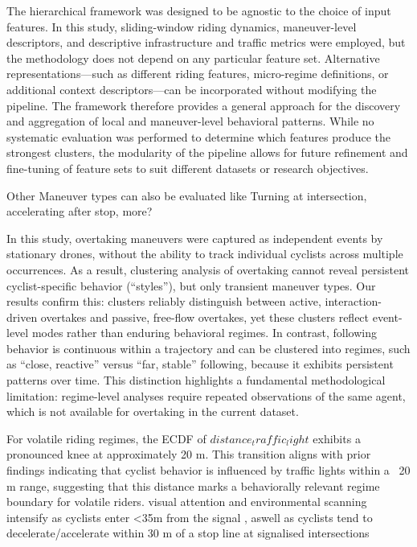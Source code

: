 The hierarchical framework was designed to be agnostic to the choice of input features. In this study, sliding-window riding dynamics, maneuver-level descriptors, and descriptive infrastructure and traffic metrics were employed, but the methodology does not depend on any particular feature set. Alternative representations—such as different riding features, micro-regime definitions, or additional context descriptors—can be incorporated without modifying the pipeline. The framework therefore provides a general approach for the discovery and aggregation of local and maneuver-level behavioral patterns. While no systematic evaluation was performed to determine which features produce the strongest clusters, the modularity of the pipeline allows for future refinement and fine-tuning of feature sets to suit different datasets or research objectives.

Other Maneuver types can also be evaluated like Turning at intersection, accelerating after stop, more?






In this study, overtaking maneuvers were captured as independent events by stationary drones, without the ability to track individual cyclists across multiple occurrences. As a result, clustering analysis of overtaking cannot reveal persistent cyclist-specific behavior (“styles”), but only transient maneuver types. Our results confirm this: clusters reliably distinguish between active, interaction-driven overtakes and passive, free-flow overtakes, yet these clusters reflect event-level modes rather than enduring behavioral regimes. In contrast, following behavior is continuous within a trajectory and can be clustered into regimes, such as “close, reactive” versus “far, stable” following, because it exhibits persistent patterns over time. This distinction highlights a fundamental methodological limitation: regime-level analyses require repeated observations of the same agent, which is not available for overtaking in the current dataset.



For volatile riding regimes, the ECDF of $distance_traffic_light$ exhibits a pronounced knee at approximately 20 m. 
This transition aligns with prior findings indicating that cyclist behavior is influenced by traffic lights within a ~20 m range, suggesting that this distance marks a behaviorally relevant regime boundary for volatile riders. 
visual attention and environmental scanning intensify as cyclists enter <35m from the signal \cite{rupi_visual_2019}, aswell as cyclists tend to decelerate/accelerate within 30 m of a stop line at signalised intersections \cite{haifeng_research_2013}



